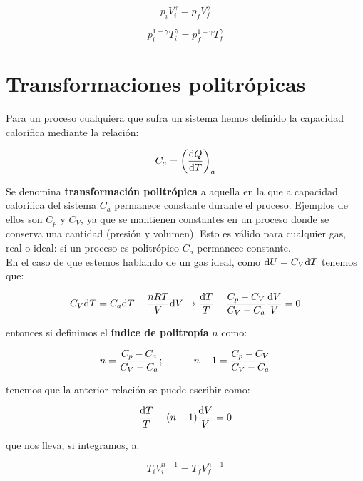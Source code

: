 \documentclass[12pt]{book}
\begin{document}
\begin{equation}
p_i V_i^{\gamma} = p_f V_f^{\gamma}
\end{equation}


\begin{equation}
p_i^{1-\gamma} T_i^{\gamma} = p_f^{1-\gamma} T_f^{\gamma} 
\end{equation}


\section{Transformaciones politrópicas}

Para un proceso cualquiera que sufra un sistema hemos definido la capacidad calorífica mediante la relación:

\begin{equation}
C_a = \left( \dfrac{\mathrm{d} Q}{\mathrm{d} T}  \right)_a
\end{equation}

Se denomina \textbf{transformación politrópica} a aquella en la que a capacidad calorífica del sistema $C_a$ permanece constante durante el proceso. Ejemplos de ellos son $C_p$ y $C_V$, ya que se mantienen constantes en un proceso donde se conserva una cantidad (presión y volumen). Esto es válido para cualquier gas, real o ideal: si un proceso es politrópico $C_a$ permanece constante. \\

En el caso de que estemos hablando de un gas ideal, como $\mathrm{d} U = C_V \mathrm{d} T$ tenemos que:

$$ C_V \mathrm{d} T = C_a \mathrm{d} T - \dfrac{nRT}{V} \mathrm{d} V \rightarrow  \dfrac{\mathrm{d} T }{T} + \dfrac{C_p - C_V}{C_V - C_a} \dfrac{\mathrm{d} V}{V} = 0 $$


entonces si definimos el \textbf{índice de politropía} $n$ como:

\begin{equation}
n = \dfrac{C_p - C_a}{C_V - C_a} ; \quad \quad \quad n -1 = \dfrac{C_p - C_V}{C_V - C_a}
\end{equation}


tenemos que la anterior relación se puede escribir como:

\begin{equation}
\dfrac{\mathrm{d} T}{T} + (n-1) \dfrac{\mathrm{d} V}{V} = 0
\end{equation}

que nos lleva, si integramos, a:



\begin{equation}
T_i V_i^{n-1} = T_f V_f^{n-1} 
\end{equation}
\end{document}
